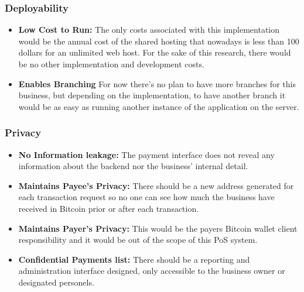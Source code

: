 \subsubsection{Deployability}
\begin{itemize}

\item \textbf{Low Cost to Run: } The only costs associated with this implementation would be the annual cost of the shared hosting that nowadays is less than 100 dollars for an unlimited web host. For the sake of this research, there would be no other implementation and development costs. 

\item \textbf{Enables Branching} For now there's no plan to have more branches for this business, but depending on the implementation, to have another branch it would be as easy as running another instance of the application on the server.

\end{itemize}
 
\subsubsection{Privacy} 
\begin{itemize}

\item \textbf{No Information leakage: } The payment interface does not reveal any information about the backend nor the business' internal detail.

\item \textbf{Maintains Payee's Privacy: } There should be a new address generated for each transaction request so no one can see how much the business have received in Bitcoin prior or after each transaction.

\item \textbf{Maintains Payer's Privacy: } This would be the payers Bitcoin wallet client responsibility and it would be out of the scope of this PoS system.

\item \textbf{Confidential Payments list: } There should be a reporting and administration interface designed, only accessible to the business owner or designated personels.

\end{itemize}
